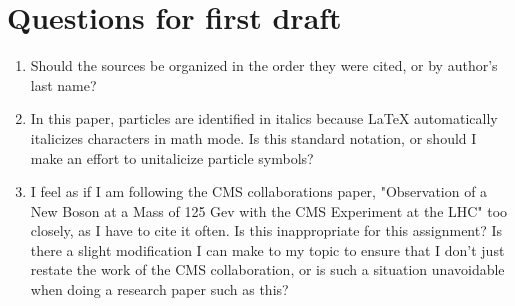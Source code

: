 \documentclass[12pt]{article}
\begin{document}
\section{Questions for first draft}
\begin{enumerate}
\item Should the sources be organized in the order they were cited, or by author's last name?
\item In this paper, particles are identified in italics because \LaTeX \; automatically italicizes characters in math mode. Is this standard notation, or should I make an effort to unitalicize particle symbols?
\item I feel as if I am following the CMS collaborations paper, "Observation of a New Boson at a Mass of 125 Gev with the CMS Experiment at the LHC" too closely, as I have to cite it often. Is this inappropriate for this assignment? Is there a slight modification I can make to my topic to ensure that I don't just restate the work of the CMS collaboration, or is such a situation unavoidable when doing a research paper such as this?
 
\end{enumerate}
\end{document}
